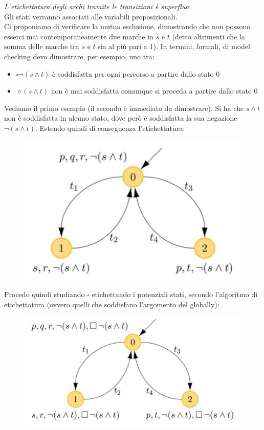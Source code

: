 \documentclass[a4paper,12pt, oneside]{book}
\begin{document}
\textit{L'etichettatura degli archi tramite le transizioni è superflua}.\\
Gli stati verranno associati alle variabili proposizionali. \\
Ci proponiamo di verificare la mutua esclusione, dimostrando che non possono
esserci mai contemporaneamente due marche in $s$ e $t$ (detto altrimenti che la
somma delle marche tra $s$ e $t$ sia al più pari a 1). In termini, formali, di
model checking devo dimostrare, per esempio, uno tra:
\begin{itemize}
  \item $\square\neg(s\land t)$ è soddisfatta per ogni percorso a partire dallo
  stato 0
  \item $\diamond(s\land t)$ non è mai soddisfatta comunque si proceda a partire
  dallo stato 0 
\end{itemize}
Vediamo il primo esempio (il secondo è immediato da dimostrare). Si ha che
$s\land t$ non è soddisfatta in alcuno stato, dove però è soddisfatta la sua
negazione $\neg(s\land t)$. Estendo quindi di conseguenza l'etichettatura:
\begin{figure}[H]
  \centering
  \includegraphics[scale = 0.45]{img/m3.jpg}
\end{figure}
\newpage
Procedo quindi studiando $\square$ etichettando i potenziali stati, secondo
l'algoritmo di etichettatura (ovvero quelli che soddisfano l'argomento del
globally): 
\begin{figure}[H]
  \centering
  \includegraphics[scale = 0.4]{img/me4.jpg}
\end{figure}
\end{document}
